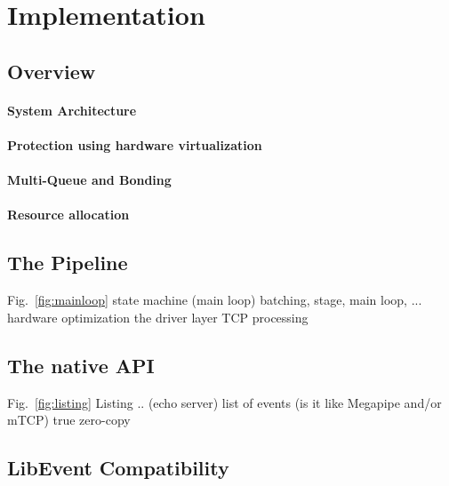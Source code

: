 
\section{Implementation}
\label{sec:impl}

\subsection{Overview}

\paragraph{System Architecture}



\paragraph{Protection using hardware virtualization}


\paragraph{Multi-Queue and Bonding}


%


\paragraph{Resource allocation}


\subsection{The \ix Pipeline}



\todo   Fig.~\ref{fig:mainloop} state machine (main loop)
\todo   batching, stage, main loop, ...
\todo   hardware optimization
\todo   the driver layer
\todo   TCP processing
     
\subsection{The \ix native API}


\todo Fig.~\ref{fig:listing} Listing .. (echo server)
\todo list of events (is it like Megapipe and/or mTCP)
\todo  true zero-copy

\subsection{LibEvent Compatibility}

